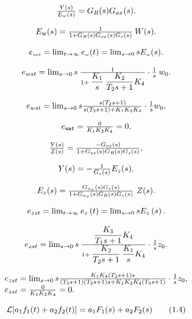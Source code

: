 \documentclass{article}
\begin{document}
\[
$$
\frac{Y ( s )} {E_{w} ( s )}=G_{R} ( s ) G_{a x} ( s ).
$$
\]

\[
$$
E_{\mathrm{w}} ( s )=\frac{1} {1+G_{R} ( s ) G_{o x} ( s ) G_{s} ( s )} \: W ( s ).
$$
\]

\[
$$
e_{\scriptscriptstyle{w \! s t}}=\lim_{t \to\infty} e_{\scriptscriptstyle{w}} ( t )=\lim_{s \to0} s E_{\scriptscriptstyle{w}} ( s ).
$$
\]

\[
$$
e_{w s t}=\lim_{s \to0} s \: \frac{1} {1+\displaystyle{\frac{K_{1}} {s}} \: \displaystyle{\frac{K_{2}} {T_{2} s+1}} K_{4}} \cdot\frac{1} {s} \: w_{0}.
$$
\]

\[
$$
e_{w s t}=\lim_{s \to0} s \frac{s ( T_{2} s+1 )} {s ( T_{2} s+1 )+K_{1} K_{2} K_{4}} \cdot\frac{1} {s} w_{0},
$$
\]

\[
$$
e_{\tt w a t}=\frac{0} {K_{1} K_{2} K_{4}}=0.
$$
\]

\[
$$
\frac{Y ( s )} {Z ( s )}=\frac{-G_{o z} ( s )} {1+G_{o z} ( s ) G_{R} ( s ) G_{s} ( s )},
$$
\]

\[
$$
Y ( s )=-\frac{1} {G_{s} ( s )} E_{z} ( s ).
$$
\]

\[
$$
E_{z} ( s )=\frac{G_{\alpha_{z}} ( s ) G_{s} ( s )} {1+G_{\alpha_{z}} ( s ) G_{R} ( s ) G_{s} ( s )} \ Z ( s ).
$$
\]

\[
$$
e_{z s t}=\lim_{t \rightarrow\infty} e_{z} \left( t \right)=\lim_{s \rightarrow0} s E_{z} \left( s \right).
$$
\]

\[
$$
e_{z s t}=\lim_{s \rightarrow0} s \: \frac{\displaystyle\frac{K_{3}} {T_{1} s+1} K_{4}} {1+\displaystyle\frac{K_{2}} {T_{2} s+1} \: \frac{K_{1}} {s} K_{4}} \cdot\frac{1} {s} z_{0}.
$$
\]

\[
$$
\begin{array} {l} {e_{z s t}=\lim_{s \rightarrow0} s \frac{K_{1} K_{4} ( T_{2} s+1 ) s} {( T_{3} s+1 ) ( T_{2} s+1 ) s+K_{1} K_{2} K_{4} ( T_{3} s+1 )} \cdot\frac{1} {s} z_{0},} \\ {e_{z s t}=\frac{0} {K_{1} K_{2} K_{4}}=0.} \\ \end{array}
$$
\]

\[
$$
{\mathcal{L}} [ a_{1} f_{1} ( t )+a_{2} f_{2} ( t ) ]=a_{1} F_{1} ( s )+a_{2} F_{2} ( s ) \tag{1.4}
$$
\]
\end{document}
